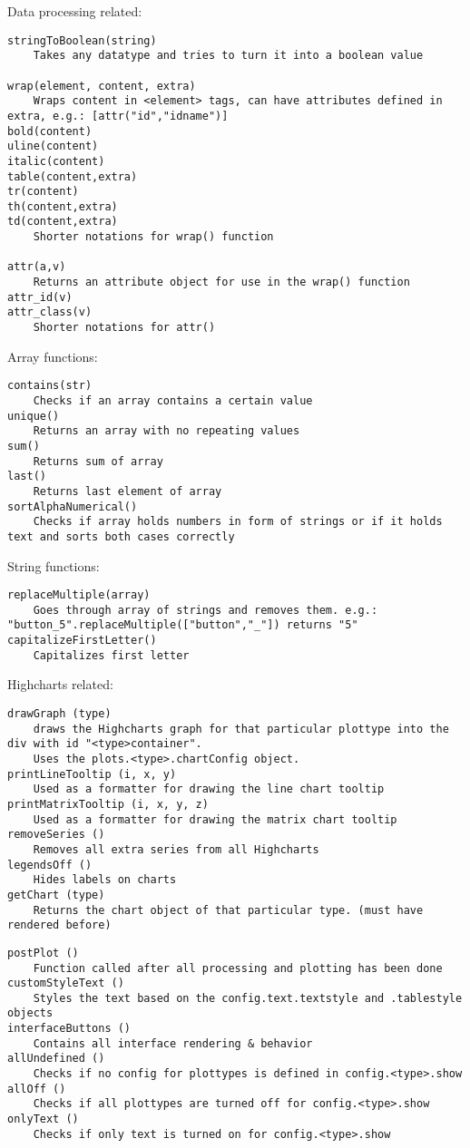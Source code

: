 Data processing related:
\begin{lstlisting}
stringToBoolean(string)
    Takes any datatype and tries to turn it into a boolean value
    
wrap(element, content, extra) 
    Wraps content in <element> tags, can have attributes defined in extra, e.g.: [attr("id","idname")]
bold(content)
uline(content)
italic(content)
table(content,extra)
tr(content)
th(content,extra)
td(content,extra)
    Shorter notations for wrap() function
    
attr(a,v)
    Returns an attribute object for use in the wrap() function
attr_id(v)
attr_class(v)
    Shorter notations for attr()
\end{lstlisting}

Array functions: 
\begin{lstlisting}
contains(str)
    Checks if an array contains a certain value
unique()
    Returns an array with no repeating values
sum()
    Returns sum of array
last()
    Returns last element of array
sortAlphaNumerical()
    Checks if array holds numbers in form of strings or if it holds text and sorts both cases correctly
\end{lstlisting}

String functions: 
\begin{lstlisting}
replaceMultiple(array)
    Goes through array of strings and removes them. e.g.: "button_5".replaceMultiple(["button","_"]) returns "5"
capitalizeFirstLetter()
    Capitalizes first letter
\end{lstlisting}

Highcharts related:
\begin{lstlisting}
drawGraph (type)                
    draws the Highcharts graph for that particular plottype into the div with id "<type>container". 
    Uses the plots.<type>.chartConfig object.
printLineTooltip (i, x, y)
    Used as a formatter for drawing the line chart tooltip
printMatrixTooltip (i, x, y, z)
    Used as a formatter for drawing the matrix chart tooltip
removeSeries ()
    Removes all extra series from all Highcharts
legendsOff ()
    Hides labels on charts
getChart (type)
    Returns the chart object of that particular type. (must have rendered before)
\end{lstlisting}

\begin{lstlisting}
postPlot ()
    Function called after all processing and plotting has been done
customStyleText ()
    Styles the text based on the config.text.textstyle and .tablestyle objects
interfaceButtons ()
    Contains all interface rendering & behavior
allUndefined ()
    Checks if no config for plottypes is defined in config.<type>.show 
allOff ()
    Checks if all plottypes are turned off for config.<type>.show 
onlyText ()
    Checks if only text is turned on for config.<type>.show 
\end{lstlisting}

